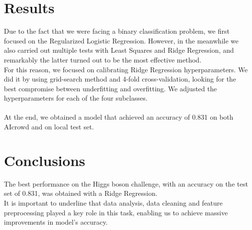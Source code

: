 \documentclass[10pt,conference,compsocconf]{IEEEtran}
\begin{document}
\section{Results}
Due to the fact that we were facing a binary classification problem, we first focused on the Regularized Logistic Regression. However, in the meanwhile we also carried out multiple tests with Least Squares and Ridge Regression, and remarkably the latter turned out to be the most effective method.\\
For this reason, we focused on calibrating Ridge Regression hyperparameters. We did it by using grid-search method and 4-fold cross-validation, looking for the best compromise between underfitting and overfitting. We adjusted the hyperparameters for
each of the four subclasses.\\
\vspace{0.05cm}\\
At the end, we obtained a model that achieved an accuracy of 0.831 on both AIcrowd and on local test set.
\section{Conclusions}
The best performance on the Higgs boson
challenge, with an accuracy on the test set of
0.831, was obtained with a Ridge Regression.\\
It is important to underline that data analysis, data cleaning and feature preprocessing played a key role in this task, enabling us to achieve massive improvements in model's accuracy.\\





\end{document}
